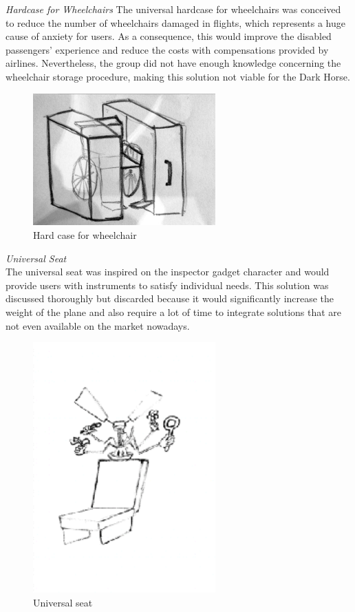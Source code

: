 \noindent\emph{Hardcase for Wheelchairs} The universal hardcase for wheelchairs was conceived to reduce the number of wheelchairs damaged in flights, which represents a huge cause of anxiety for users. As a consequence, this would improve the disabled passengers’ experience and reduce the costs with compensations provided by airlines. Nevertheless, the group did not have enough knowledge concerning the wheelchair storage procedure, making this solution not viable for the Dark Horse. \\


\begin{figure}[h]
\centering
\includegraphics[width=7cm]{brazil_images/image008.jpg}
\caption{Hard case for wheelchair}
\label{fig:hardcase}
\end{figure}


\noindent\emph{Universal Seat}\\ The universal seat was inspired on the inspector gadget character and would provide users with instruments to satisfy individual needs. This solution was discussed thoroughly but discarded because it would significantly increase the weight of the plane and also require a lot of time to integrate solutions that are not even available on the market nowadays. \\

\begin{figure}[h]
\centering
\includegraphics[width=7cm]{brazil_images/image009.png}
\caption{Universal seat}
\label{fig:universal_seat}
\end{figure}

